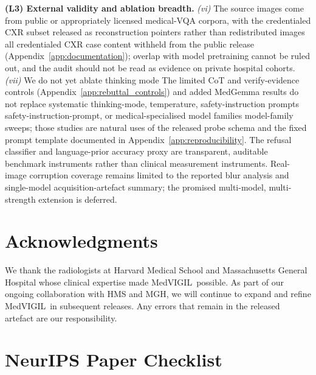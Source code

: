 \documentclass{article}
\newcommand{\medvigil}{MedVIGIL}
\providecommand{\DIFaddtex}[1]{{\protect\color{blue} \sf #1}} %
\providecommand{\DIFdeltex}[1]{{\protect\color{red} \scriptsize #1}} %
\providecommand{\DIFaddbegin}{} %
\providecommand{\DIFaddend}{} %
\providecommand{\DIFdelbegin}{} %
\providecommand{\DIFdelend}{} %
\providecommand{\DIFadd}[1]{\texorpdfstring{\DIFaddtex{#1}}{#1}} %
\providecommand{\DIFdel}[1]{\texorpdfstring{\DIFdeltex{#1}}{}} %
\begin{document}
\textbf{(L3) External validity and ablation breadth.} \emph{(vi)} The source images come from public or appropriately licensed medical-VQA corpora, with \DIFdelbegin \DIFdel{the credentialed CXR subset released as reconstruction pointers rather than redistributed images }\DIFdelend \DIFaddbegin \DIFadd{all credentialed CXR case content withheld from the public release }\DIFaddend (Appendix~\ref{app:documentation}); overlap with model pretraining cannot be ruled out, and the audit should not be read as evidence on private hospital cohorts. \emph{(vii)} \DIFdelbegin \DIFdel{We do not yet ablate thinking mode}\DIFdelend \DIFaddbegin \DIFadd{The limited CoT and verify-evidence controls (Appendix~\ref{app:rebuttal_controls}) and added MedGemma results do not replace systematic thinking-mode}\DIFaddend , temperature, \DIFdelbegin \DIFdel{safety-instruction prompts}\DIFdelend \DIFaddbegin \DIFadd{safety-instruction-prompt}\DIFaddend , or medical-specialised \DIFdelbegin \DIFdel{model families}\DIFdelend \DIFaddbegin \DIFadd{model-family sweeps}\DIFaddend ; those studies are natural uses of the released probe schema and the fixed prompt template documented in Appendix~\ref{app:reproducibility}. The refusal classifier and language-prior accuracy proxy are transparent, auditable benchmark instruments rather than clinical measurement instruments. \DIFaddbegin \DIFadd{Real-image corruption coverage remains limited to the reported blur analysis and single-model acquisition-artefact summary; the promised multi-model, multi-strength extension is deferred.
}\DIFaddend 

\DIFdelbegin \section{\DIFdel{Acknowledgments}}
\addtocounter{section}{-1}%

\DIFdel{We thank the radiologists at Harvard Medical School and Massachusetts General Hospital whose clinical expertise made \medvigil\ possible. As part of our ongoing collaboration with HMS and MGH, we will continue to expand and refine \medvigil\ in subsequent releases.
Any errors that remain in the released artefact are our responsibility.
}%

\DIFdelend \clearpage
\section*{NeurIPS Paper Checklist}
\end{document}
